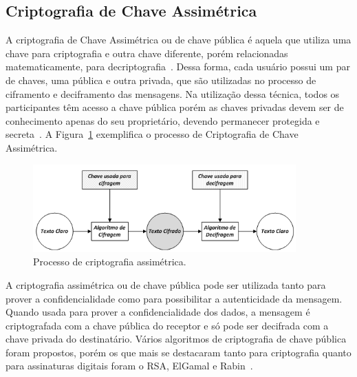 \subsection{Criptografia de Chave Assimétrica}

A criptografia de Chave Assimétrica ou de chave pública é aquela que utiliza uma chave para criptografia e outra chave diferente, porém relacionadas matematicamente, para decriptografia~\cite{stallings2008}. Dessa forma, cada usuário possui um par de chaves, uma pública e outra privada, que são utilizadas no processo de ciframento e deciframento das mensagens. Na utilização dessa técnica, todos os participantes têm acesso a chave pública porém as chaves privadas devem ser de conhecimento apenas do seu proprietário, devendo permanecer protegida e secreta~\cite{stallings2008}. A Figura~\ref{fig:criptografiaassimetrica} exemplifica o processo de Criptografia de Chave Assimétrica.

\begin{figure}[!htb]
\centering
\includegraphics[width=0.9\textwidth]{criptografiaassimetrica1.png}
\caption{Processo de criptografia assimétrica.}
\label{fig:criptografiaassimetrica}
\end{figure}

A criptografia assimétrica ou de chave pública pode ser utilizada tanto para prover a confidencialidade como para possibilitar a autenticidade da mensagem. Quando usada para prover a confidencialidade dos dados, a mensagem é criptografada com a chave pública do receptor e só pode ser decifrada com a chave privada do destinatário. Vários algoritmos de criptografia de chave pública foram propostos, porém os que mais se destacaram  tanto para  criptografia quanto para assinaturas digitais foram o RSA, ElGamal e Rabin~\cite{Schneier1995}.

